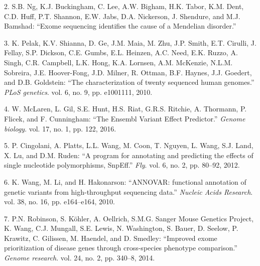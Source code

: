 \documentclass[12pt,twoside]{reedthesis}
\theoremstyle{definition}
\theoremstyle{definition}
\theoremstyle{remark}
\begin{document}
  \hypertarget{ref-Ng}{}
  2. S.B. Ng, K.J. Buckingham, C. Lee, A.W. Bigham, H.K. Tabor, K.M. Dent,
  C.D. Huff, P.T. Shannon, E.W. Jabs, D.A. Nickerson, J. Shendure, and
  M.J. Bamshad: ``Exome sequencing identifies the cause of a Mendelian
  disorder.''
  
  \hypertarget{ref-Pelak2010}{}
  3. K. Pelak, K.V. Shianna, D. Ge, J.M. Maia, M. Zhu, J.P. Smith, E.T.
  Cirulli, J. Fellay, S.P. Dickson, C.E. Gumbs, E.L. Heinzen, A.C. Need,
  E.K. Ruzzo, A. Singh, C.R. Campbell, L.K. Hong, K.A. Lornsen, A.M.
  McKenzie, N.L.M. Sobreira, J.E. Hoover-Fong, J.D. Milner, R. Ottman,
  B.F. Haynes, J.J. Goedert, and D.B. Goldstein: ``The characterization of
  twenty sequenced human genomes.'' \emph{PLoS genetics}. vol. 6, no. 9,
  pp. e1001111, 2010.
  
  \hypertarget{ref-McLaren2016}{}
  4. W. McLaren, L. Gil, S.E. Hunt, H.S. Riat, G.R.S. Ritchie, A.
  Thormann, P. Flicek, and F. Cunningham: ``The Ensembl Variant Effect
  Predictor.'' \emph{Genome biology}. vol. 17, no. 1, pp. 122, 2016.
  
  \hypertarget{ref-Cingolani2012}{}
  5. P. Cingolani, A. Platts, L.L. Wang, M. Coon, T. Nguyen, L. Wang, S.J.
  Land, X. Lu, and D.M. Ruden: ``A program for annotating and predicting
  the effects of single nucleotide polymorphisms, SnpEff.'' \emph{Fly}.
  vol. 6, no. 2, pp. 80--92, 2012.
  
  \hypertarget{ref-Wang2010}{}
  6. K. Wang, M. Li, and H. Hakonarson: ``ANNOVAR: functional annotation
  of genetic variants from high-throughput sequencing data.''
  \emph{Nucleic Acids Research}. vol. 38, no. 16, pp. e164--e164, 2010.
  
  \hypertarget{ref-Robinson2014}{}
  7. P.N. Robinson, S. Köhler, A. Oellrich, S.M.G. Sanger Mouse Genetics
  Project, K. Wang, C.J. Mungall, S.E. Lewis, N. Washington, S. Bauer, D.
  Seelow, P. Krawitz, C. Gilissen, M. Haendel, and D. Smedley: ``Improved
  exome prioritization of disease genes through cross-species phenotype
  comparison.'' \emph{Genome research}. vol. 24, no. 2, pp. 340--8, 2014.
  
\end{document}
